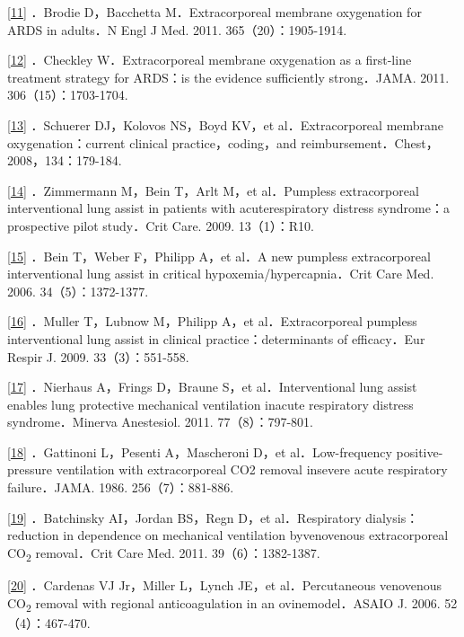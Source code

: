 \protect\hyperlink{text00030.htmlux5cux23ch11-29-back}{{[}11{]}}
．Brodie D，Bacchetta M．Extracorporeal membrane oxygenation for ARDS in
adults．N Engl J Med. 2011. 365（20）：1905-1914.

\protect\hyperlink{text00030.htmlux5cux23ch12-29-back}{{[}12{]}}
．Checkley W．Extracorporeal membrane oxygenation as a first-line
treatment strategy for ARDS：is the evidence sufficiently strong．JAMA.
2011. 306（15）：1703-1704.

\protect\hyperlink{text00030.htmlux5cux23ch13-29-back}{{[}13{]}}
．Schuerer DJ，Kolovos NS，Boyd KV，et al．Extracorporeal membrane
oxygenation：current clinical practice，coding，and
reimbursement．Chest，2008，134：179-184.

\protect\hyperlink{text00030.htmlux5cux23ch14-29-back}{{[}14{]}}
．Zimmermann M，Bein T，Arlt M，et al．Pumpless extracorporeal
interventional lung assist in patients with acuterespiratory distress
syndrome：a prospective pilot study．Crit Care. 2009. 13（1）：R10.

\protect\hyperlink{text00030.htmlux5cux23ch15-29-back}{{[}15{]}} ．Bein
T，Weber F，Philipp A，et al．A new pumpless extracorporeal
interventional lung assist in critical hypoxemia/hypercapnia．Crit Care
Med. 2006. 34（5）：1372-1377.

\protect\hyperlink{text00030.htmlux5cux23ch16-29-back}{{[}16{]}}
．Muller T，Lubnow M，Philipp A，et al．Extracorporeal pumpless
interventional lung assist in clinical practice：determinants of
efficacy．Eur Respir J. 2009. 33（3）：551-558.

\protect\hyperlink{text00030.htmlux5cux23ch17-29-back}{{[}17{]}}
．Nierhaus A，Frings D，Braune S，et al．Interventional lung assist
enables lung protective mechanical ventilation inacute respiratory
distress syndrome．Minerva Anestesiol. 2011. 77（8）：797-801.

\protect\hyperlink{text00030.htmlux5cux23ch18-29-back}{{[}18{]}}
．Gattinoni L，Pesenti A，Mascheroni D，et al．Low-frequency
positive-pressure ventilation with extracorporeal CO2 removal insevere
acute respiratory failure．JAMA. 1986. 256（7）：881-886.

\protect\hyperlink{text00030.htmlux5cux23ch19-29-back}{{[}19{]}}
．Batchinsky AI，Jordan BS，Regn D，et al．Respiratory
dialysis：reduction in dependence on mechanical ventilation byvenovenous
extracorporeal CO\textsubscript{2} removal．Crit Care Med. 2011.
39（6）：1382-1387.

\protect\hyperlink{text00030.htmlux5cux23ch20-29-back}{{[}20{]}}
．Cardenas VJ Jr，Miller L，Lynch JE，et al．Percutaneous venovenous
CO\textsubscript{2} removal with regional anticoagulation in an
ovinemodel．ASAIO J. 2006. 52（4）：467-470.

